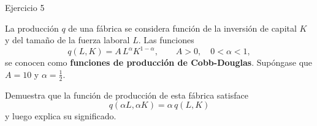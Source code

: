 \documentclass[aspectratio=169]{beamer}
\begin{document}
\begin{frame}{Ejercicio 5}
  \begin{mwejercicio}
    La producción \(q\) de una fábrica se considera función de la inversión de
    capital \(K\) y del tamaño de la fuerza laboral \(L\). Las funciones
    \[
      q(L,K)=A\,L^{\alpha}K^{1-\alpha},\qquad A>0,\quad 0<\alpha<1,
    \]
    se conocen como \textbf{funciones de producción de Cobb-Douglas}.
    Supóngase que \(A=10\) y \(\alpha=\tfrac12\).

    Demuestra que la función de producción de esta fábrica satisface
    \[
      q(\alpha L,\alpha K)=\alpha\,q(L,K)
    \]
    y luego explica su significado.
  \end{mwejercicio}
\end{frame}
\end{document}
